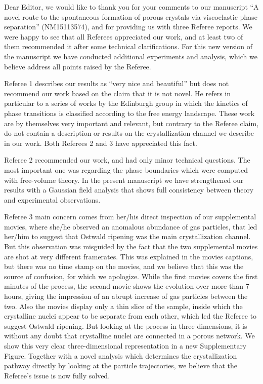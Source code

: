 \documentclass[11pt]{article}
\begin{document}
\doublespacing



\doublespacing

\noindent
Dear Editor,
\vskip 0.3cm
we would like to thank you for your comments to our manuscript ``A novel route to the spontaneous formation of porous crystals via viscoelastic phase separation'' (NM15113574),
and for providing us with three Referee reports.
We were happy to see that all Referees appreciated our work, and at least two of them recommended it after some technical clarifications.
For this new version of the manuscript we have conducted additional experiments and analysis,
which we believe address all points raised by the Referee.

Referee 1 describes our results as ``very nice and beautiful'' but does not recommend our work
based on the claim that it is not novel. He refers in particular to a series of works by the Edinburgh group in which the kinetics of phase
transitions is classified according to the free energy landscape. These work are by themselves very important and relevant, but contrary
to the Referee claim, do not contain a description or results on the crystallization channel we describe in our work.
Both Referees 2 and 3 have appreciated this fact.

Referee 2 recommended our work, and had only minor technical questions. The most important one was regarding the phase boundaries
which were computed with free-volume theory. In the present manuscript we have strengthened our results with a Gaussian field analysis
that shows full consistency between theory and experimental observations.

Referee 3 main concern comes from her/his direct inspection of our supplemental movies, where she/he observed an anomalous abundance
of gas particles, that led her/him to suggest that Ostwald ripening was the main crystallization channel. But this observation
was misguided by the fact that the two supplemental movies are shot at very different framerates. This was explained in the movies captions,
but there was no time stamp on the movies, and we believe that this was the source of confusion, for which we apologize. While the first movies covers
the first minutes of the process, the second movie shows the evolution over more than 7 hours, giving the impression
of an abrupt increase of gas particles between the two. Also the movies display only a thin slice of the sample, inside which
the crystalline nuclei appear to be separate from each other, which led the Referee to suggest Ostwald ripening. But looking at the process in three dimensions,
it is without any doubt that crystalline nuclei are connected in a porous network. We show this very clear three-dimensional representation in a new Supplementary Figure.
Together with a novel analysis which determines the crystallization pathway directly by looking
at the particle trajectories, we believe that the Referee's issue is now fully solved.
\end{document}
